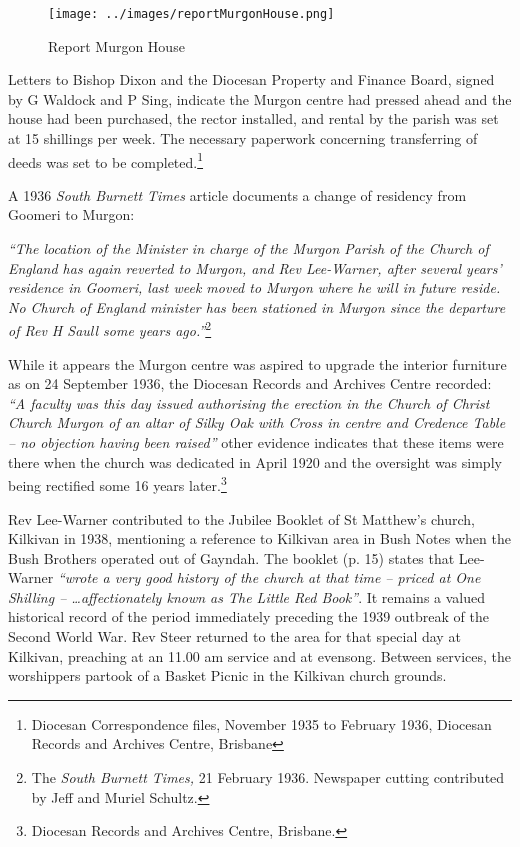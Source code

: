 \begin{figure}[!htb]
\begin{center}
\texttt{[image: ../images/reportMurgonHouse.png]}
\caption{Report Murgon House}
\end{center}
\end{figure}




Letters to Bishop Dixon and the Diocesan Property and Finance Board, signed by G Waldock and P Sing, indicate the Murgon centre had pressed ahead and the house had been purchased, the rector installed, and rental by the parish was set at 15 shillings per week. The necessary paperwork concerning transferring of deeds was set to be completed.\footnote{Diocesan Correspondence files, November 1935 to February 1936, Diocesan Records and Archives Centre, Brisbane}


A 1936 \emph{South Burnett Times} article documents a change of residency from Goomeri to Murgon:



\emph{``The location of the Minister in charge of the Murgon Parish of the Church of England has again reverted to Murgon, and Rev Lee-Warner, after several years' residence in Goomeri, last week moved to Murgon where he will in future reside. No Church of England minister has been stationed in Murgon since the departure of Rev H Saull some years ago.''}\footnote{The \emph{South Burnett Times,} 21 February 1936. Newspaper cutting contributed by Jeff and Muriel Schultz.}


\smallskip


While it appears the Murgon centre was aspired to upgrade the interior furniture as on 24 September 1936, the Diocesan Records and Archives Centre recorded: \emph{``A faculty was this day issued authorising the erection in the Church of Christ Church Murgon of an altar of Silky Oak with Cross in centre and Credence Table -- no objection having been raised''} other evidence indicates that these items were there when the church was dedicated in April 1920 and the oversight was simply being rectified some 16 years later.\footnote{Diocesan Records and Archives Centre, Brisbane.}


Rev Lee-Warner contributed to the Jubilee Booklet of St Matthew's church, Kilkivan in 1938, mentioning a reference to Kilkivan area in Bush Notes when the Bush Brothers operated out of Gayndah. The booklet (p. 15) states that Lee-Warner \emph{``wrote a very good history of the church at that time -- priced at One Shilling -- \ldots affectionately known as The Little Red Book''}. It remains a valued historical record of the period immediately preceding the 1939 outbreak of the Second World War. Rev Steer returned to the area for that special day at Kilkivan, preaching at an 11.00 am service and at evensong. Between services, the worshippers partook of a Basket Picnic in the Kilkivan church grounds.



